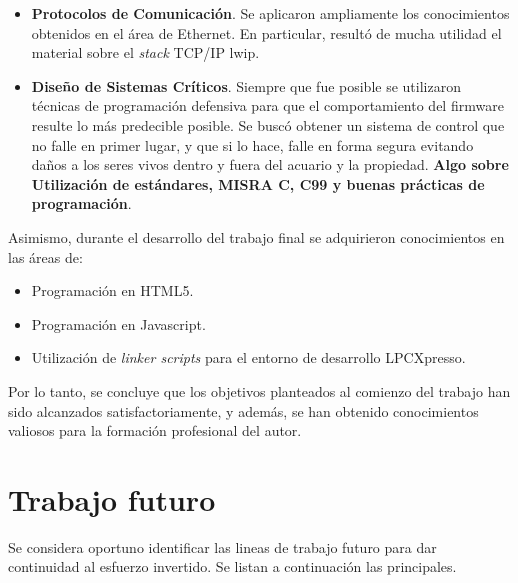 \begin{itemize}
\item 
\textbf{Protocolos de Comunicación}. Se aplicaron ampliamente los conocimientos obtenidos en el área de Ethernet. En particular, resultó de mucha utilidad el material sobre el \textit{stack} TCP/IP lwip.

\item
\textbf{Diseño de Sistemas Críticos}. Siempre que fue posible se utilizaron técnicas de programación defensiva para que el comportamiento del firmware resulte lo más predecible posible.  Se buscó obtener un sistema de control que no falle en primer lugar, y que si lo hace, falle en forma segura evitando daños a los seres vivos dentro y fuera del acuario y la propiedad. \textbf{Algo sobre Utilización de estándares, MISRA C, C99 y buenas prácticas de programación}.
\end{itemize}



\medskip

\noindent Asimismo, durante el desarrollo del trabajo final se adquirieron conocimientos en las áreas de:

\begin{itemize}
	\item Programación en HTML5.
	\item Programación en Javascript.  
	\item Utilización de \textit{linker scripts} para el entorno de desarrollo LPCXpresso.
\end{itemize}


\medskip

Por lo tanto, se concluye que los objetivos planteados al comienzo del trabajo han sido alcanzados satisfactoriamente, y además, se han obtenido conocimientos valiosos para la formación profesional del autor.

\clearpage
\section{Trabajo futuro}

Se considera oportuno identificar las lineas de trabajo futuro para dar continuidad al esfuerzo invertido.  Se listan a continuación las principales.

